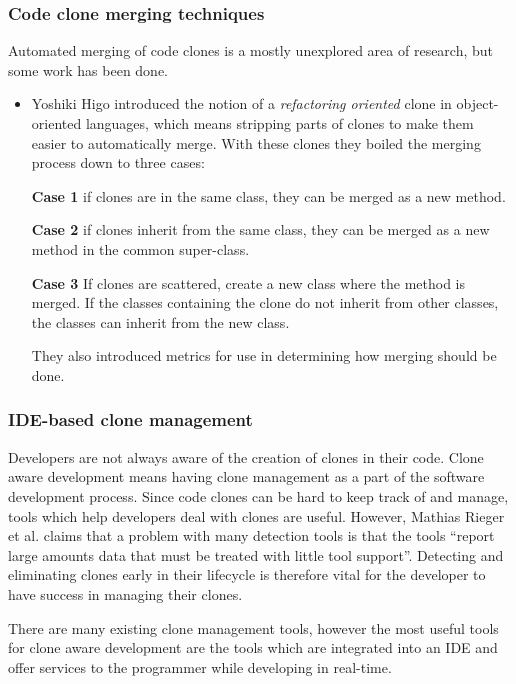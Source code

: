 \documentclass[12pt]{article}
\begin{document}
\subsubsection{Code clone merging techniques}

Automated merging of code clones is a mostly unexplored area of research, but some work has
been done.

\begin{itemize}
	\item
	      Yoshiki Higo\cite{RefactoringOrientedClonesAndMerging} introduced the notion of a
	      \textit{refactoring oriented} clone in object-oriented languages, which means stripping
	      parts of clones to make them easier to automatically merge. With these clones they boiled
	      the merging process down to three cases:

	      \textbf{Case 1} if clones are in the same class, they can be merged as a new method.

	      \textbf{Case 2} if clones inherit from the same class, they can be merged as a new
	      method in the common super-class.

	      \textbf{Case 3} If clones are scattered, create a new class where the method is merged. If
	      the classes containing the clone do not inherit from other classes, the classes can
	      inherit from the new class.

	      They also introduced metrics for use in determining how merging should be done.
\end{itemize}

\subsubsection{IDE-based clone management}

Developers are not always aware of the creation of clones in their code. Clone aware
development means having clone management as a part of the software development
process. Since code clones can be hard to keep track of and manage, tools which help
developers deal with clones are useful. However, Mathias Rieger et al. claims that
a problem with many detection tools is that the tools ``report large amounts data that must
be treated with little tool support''\cite[1]{InsightsSystemWideDuplication}. Detecting
and eliminating clones early in their lifecycle is therefore vital for the developer to
have success in managing their clones.

There are many existing clone management tools, however the most useful tools for clone
aware development are the tools which are integrated into an IDE and offer services to the
programmer while developing in real-time.
\end{document}
